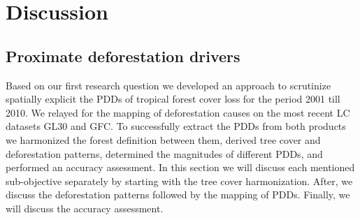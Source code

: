 \chapter{Discussion}
\label{ch:discussion}

	\section{Proximate deforestation drivers}
	\label{sec:discussion_deforestation}
		Based on our first research question we developed an approach to scrutinize spatially explicit the \acp{PDD} of tropical forest cover loss for the period 2001 till 2010. We relayed for the mapping of deforestation causes on the most recent \ac{LC} datasets \ac{GL30} and \ac{GFC}. To successfully extract the \acp{PDD} from both products we harmonized the forest definition between them, derived tree cover and deforestation patterns, determined the magnitudes of different \acp{PDD}, and performed an accuracy assessment. In this section we will discuss each mentioned sub-objective separately by starting with the tree cover harmonization. After, we discuss the deforestation patterns followed by the mapping of \acp{PDD}. Finally, we will discuss the accuracy assessment. 

